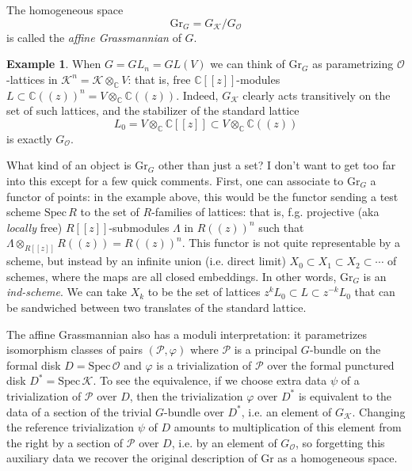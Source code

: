 \documentclass[11pt]{amsart}
\theoremstyle{definition}
\newtheorem{example}[dummy]{Example}
\newcommand{\bC}{\mathbb{C}}
\newcommand{\Kc}{\mathcal{K}}
\newcommand{\Gr}{\mathrm{Gr}}
\newcommand{\Oc}{\mathcal{O}}
\newcommand{\Spec}{\mathrm{Spec}\,}
\numberwithin{equation}{subsection}
\numberwithin{figure}{subsection}
\begin{document}
The homogeneous space
$$
\Gr_G = G_\Kc/G_\Oc
$$
is called the \emph{affine Grassmannian} of $G$. 

\begin{example}
When $G=GL_n=GL(V)$ we can think of $\Gr_G$ as parametrizing $\Oc$-lattices in $\Kc^n=\Kc\otimes_\bC V$: that is, free $\bC[[z]]$-modules $L\subset \bC((z))^n=V\otimes_\bC\bC((z))$. Indeed, $G_\Kc$ clearly acts transitively on the set of such lattices, and the stabilizer of the standard lattice 
$$
L_0 = V \otimes_{\bC}\bC[[z]]\subset V \otimes_{\bC}\bC((z))
$$
is exactly $G_\Oc$.
\end{example}

What kind of an object is $\Gr_G$ other than just a set? I don't want to get too far into this except for a few quick comments. First, one can associate to $\Gr_G$ a functor of points: in the example above, this would be the functor sending a test scheme 
$\Spec R$ to the set of $R$-families of lattices: that is, f.g. projective (aka \emph{locally} free) $R[[z]]$-submodules $\Lambda$ in $R((z))^n$ such that $\Lambda\otimes_{R[[z]]}R((z))=R((z))^n$.
 This functor is not quite representable by a scheme, but instead by an infinite union (i.e. direct limit)
$
X_0\subset X_1\subset X_2\subset\cdots
$
of schemes, where the maps are all closed embeddings. In other words, $\Gr_G$ is an \emph{ind-scheme}. We can take $X_k$ to be the set of lattices  $z^{k}L_0\subset L\subset z^{-k}L_0$ that can be sandwiched between two translates of the standard lattice.





The affine Grassmannian also has a moduli interpretation: it parametrizes isomorphism classes of pairs $(\mathcal{P},\varphi)$ where $\mathcal{P}$ is a principal $G$-bundle on the formal disk $D=\Spec \Oc$ and $\varphi$ is a trivialization of $\mathcal{P}$ over the formal punctured disk $D^*=\Spec\Kc$. To see the equivalence, if we choose extra data $\psi$ of a trivialization of $\mathcal{P}$ over $D$, then the trivialization $\varphi$ over $D^*$ is equivalent to the data of a section of the trivial $G$-bundle over $D^*$, i.e. an element of $G_\Kc$. Changing the reference trivialization $\psi$ of $D$ amounts to multiplication of this element from the right by a section of $\mathcal{P}$ over $D$, i.e. by an element of $G_\Oc$, so forgetting this auxiliary data we recover the original description of $\Gr$ as a homogeneous space.
\end{document}
